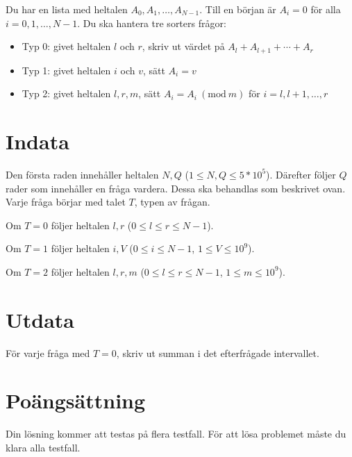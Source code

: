 \newcommand{\Mod}[1]{\ (\mathrm{mod}\ #1)}

Du har en lista med heltalen $A_0, A_1, \dots, A_{N-1}$. Till en början är $A_i=0$ för alla $i=0,1,\dots,N-1$.
Du ska hantera tre sorters frågor:

\begin{itemize}
    \item Typ 0: givet heltalen $l$ och $r$, skriv ut värdet på  $A_l + A_{l+1} + \cdots + A_{r}$
    \item Typ 1: givet heltalen $i$ och $v$, sätt $A_i=v$
    \item Typ 2: givet heltalen $l,r,m$, sätt $A_i=A_i \Mod{m}$ för $i=l,l+1,\dots,r$
\end{itemize}

\section*{Indata}
Den första raden innehåller heltalen $N, Q$ ($1 \leq N, Q \leq 5*10^5$).
Därefter följer $Q$ rader som innehåller en fråga vardera. Dessa ska behandlas som beskrivet ovan.
Varje fråga börjar med talet $T$, typen av frågan.

Om $T=0$ följer heltalen $l,r$ ($0 \leq l \leq r \leq N - 1$).

Om $T=1$ följer heltalen $i, V$ ($0 \leq i \leq N - 1$, $1 \leq V \leq 10^9$).

Om $T=2$ följer heltalen $l,r,m$ ($0 \leq l \leq r \leq N-1$, $1 \leq m \leq 10^9$).

\section*{Utdata}
För varje fråga med $T=0$, skriv ut summan i det efterfrågade intervallet.

\section*{Poängsättning}
Din lösning kommer att testas på flera testfall.
\noindent
För att lösa problemet måste du klara alla testfall.
